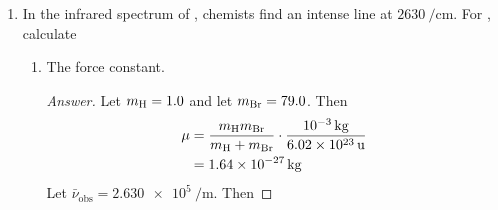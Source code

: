 \documentclass[../psets.tex]{subfiles}
\begin{document}
\begin{enumerate}
\begin{enumerate}
\begin{proof}[Answer]
            we have that
            \begin{align*}
                \tilde{V} &= V(0)+V'(0)x+\frac{1}{2}V''(0)x^2\\
                \Aboxed{\tilde{V} &= D\beta^2x^2}
            \end{align*}
        \end{proof}
        \item Comparing the result with the potential for the harmonic oscillator, give an expression for the harmonic force constant $k$ in terms of $D$ and $\beta$.
        \begin{proof}[Answer]
            For a harmonic oscillator, we have $V(x)=kx^2/2$. Setting this equal to the above, we have that
            \begin{align*}
                \frac{1}{2}kx^2 &= D\beta^2x^2\\
                \Aboxed{k &= 2D\beta^2}
            \end{align*}
        \end{proof}
        \item Given that $D=\SI{7.31e-19}{\joule\per molecule}$ and $\beta=\SI{1.81e10}{\per\meter}$ for , calculate the force constant for .
        \begin{proof}[Answer]
            Plugging the given values into the equation from part (b) gives
            \begin{equation*}
                \boxed{k = \SI[per-mode=symbol]{479}{\newton\per\meter}}
            \end{equation*}
        \end{proof}
    \end{enumerate}
    \item In the infrared spectrum of , chemists find an intense line at $\SI{2630}{\per\centi\meter}$. For , calculate
    \begin{enumerate}
        \item The force constant.
        \begin{proof}[Answer]
            Let $m_{\ce{H}}=1.0$ and let $m_{\ce{Br}}=79.0$. Then
            \begin{align*}
                \mu &= \frac{m_{\ce{H}}m_{\ce{Br}}}{m_{\ce{H}}+m_{\ce{Br}}}\cdot\frac{\SI{e-3}{\kilo\gram}}{\SI{6.02e23}{\atomicmassunit}}\\
                &= \SI{1.64e-27}{\kilo\gram}
            \end{align*}
            Let $\bar{\nu}_\text{obs}=\SI{2.630e5}{\per\meter}$. Then

\end{proof}
\end{enumerate}
\end{enumerate}
\end{document}
